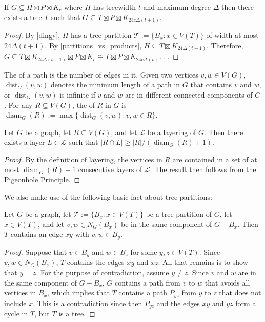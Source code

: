\documentclass{patmorin}
\DeclareMathOperator{\dist}{dist}
\DeclareMathOperator{\diam}{diam}
\newcommand\subsetcong{\mathrel{\text{%
    \setbox0\hbox{$\subseteq$}%
    \rlap{\hbox to \wd0{\hss\hss\hss\raisebox{1.5\height}{$\sim$}\hss}}\box0
}}}
\renewcommand{\subsetcong}{\subseteq}
\renewcommand{\ge}{\geqslant}
\begin{document}
\begin{cor}\label{ding_translation}
  If $G\subsetcong H\boxtimes P\boxtimes K_c$ where $H$ has treewidth $t$ and maximum degree $\Delta$ then there exists a tree $T$ such that $G\subsetcong T\boxtimes P\boxtimes K_{24c\Delta (t+1)}$.
\end{cor}

\begin{proof}
  By \cref{dingy}, $H$ has a tree-partition $\mathcal{T}:=\{B_x:x\in V(T)\}$ of width at most $24\Delta (t+1)$. By \cref{partitions_vs_products}, $H \subsetcong T\boxtimes K_{24\Delta (t+1)}$.  Therefore, $G\subsetcong T\boxtimes K_{24\Delta (t+1)}\boxtimes P\boxtimes K_c \cong T\boxtimes P\boxtimes K_{24c\Delta (t+1)}$.
\end{proof}

The  of a path is the number of edges in it. Given two vertices $v,w\in V(G)$, $\dist_G(v,w)$ denotes the minimum length of a path in $G$ that contains $v$ and $w$, or $\dist_G(v,w)$ is infinite if $v$ and $w$ are in different connected components of $G$. For any $R\subseteq V(G)$, the  of $R$ in $G$ is $\diam_G(R):=\max\{\dist_G(v,w):v,w\in R\}$.

\begin{obs}\label{diameter_spread}
  Let $G$ be a graph, let $R\subseteq V(G)$, and let $\mathcal{L}$ be a layering of $G$.  Then there exists a layer $L\in\mathcal{L}$ such that $|R\cap L|\ge |R|/(\diam_G(R)+1)$.
\end{obs}

\begin{proof}
  By the definition of layering, the vertices in $R$ are contained in a set of at most $\diam_G(R)+1$ consecutive layers of $\mathcal{L}$. The result then follows from the Pigeonhole Principle.
\end{proof}


We also make use of the following basic fact about tree-partitions:

\begin{obs}\label{tree_thingy}
  Let $G$ be a graph, let $\mathcal{T}:=\{B_x:x\in V(T)\}$ be a tree-partition of $G$, let $x\in V(T)$, and let $v,w\in N_G(B_x)$ be in the same component of $G-B_x$.  Then $T$ contains an edge $xy$ with $v,w\in B_y$.
\end{obs}

\begin{proof}
  Suppose that $v\in B_y$ and $w\in B_z$ for some $y,z\in V(T)$.  Since $v,w\in N_G(B_x)$, $T$ contains the edges $xy$ and $xz$.  All that remains is to show that $y=z$. For the purpose of contradiction, assume $y\neq z$.  Since $v$ and $w$ are in the same component of $G-B_x$, $G$ contains a path from $v$ to $w$ that avoids all vertices in $B_x$, which implies that $T$ contains a path $P_{yz}$ from $y$ to $z$ that does not include $x$.  This is a contradiction since then $P_{yz}$ and the edges $xy$ and $yz$ form a cycle in $T$, but $T$ is a tree.
\end{proof}
\end{document}

